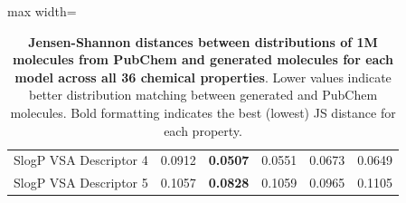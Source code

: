 \begin{table}[h!]
\begin{adjustbox}{max width=\textwidth}
\begin{tabular}{|l|c|c|c|c|c|}
    SlogP VSA Descriptor 4 & 0.0912 & \textbf{0.0507} & 0.0551 & 0.0673 & 0.0649 \\
    SlogP VSA Descriptor 5 & 0.1057 & \textbf{0.0828} & 0.1059 & 0.0965 & 0.1105 \\
    \hline
    \end{tabular}
    \end{adjustbox}
    \caption{{\bf Jensen-Shannon distances between distributions of 1M molecules from PubChem and generated molecules for each model across all 36 chemical properties}. Lower values indicate better distribution matching between generated and PubChem molecules. Bold formatting indicates the best (lowest) JS distance for each property.}
    \label{tab:js_supplementary}
    \end{table}